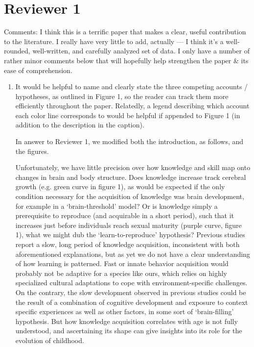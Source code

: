 \documentclass{article}
\newcommand{\rev}[1]{{\color{Red}#1}}
\newcommand{\comment}[1]{{\color{Blue}#1}}
\begin{document}
\section{Reviewer 1}
Comments:
I think this is a terrific paper that makes a clear, useful contribution to the literature. I really have very little to add, actually — I think it’s a well-rounded, well-written, and carefully analyzed set of data. I only have a number of rather minor comments below that will hopefully help strengthen the paper \& its ease of comprehension.
\begin{enumerate}
    \item It would be helpful to name and clearly state the three competing accounts / hypotheses, as outlined in Figure 1, so the reader can track them more efficiently throughout the paper. Relatedly, a legend describing which account each color line corresponds to would be helpful if appended to Figure 1 (in addition to the description in the caption).
    
    \comment{In answer to Reviewer 1, we modified both the introduction, as follows, and the figures.}
    
    \rev{Unfortunately, we have little precision over how knowledge and skill map onto changes in brain and body structure. Does knowledge increase track cerebral growth (e.g. green curve in figure 1), as would be expected if the only condition necessary for the acquisition of knowledge was brain development, for example in a `brain-threshold' model? Or is knowledge simply a prerequisite to reproduce (and acquirable in a short period), such that it increases just before individuals reach sexual maturity (purple curve, figure 1), what we might dub the `learn-to-reproduce' hypothesis? Previous studies report a slow, long period of knowledge acquisition, inconsistent with both aforementioned explanations, but as yet we do not have a clear understanding of how learning is patterned. Fast or innate behavior acquisition would probably not be adaptive for a species like ours, which relies on highly specialized cultural adaptations to cope with environment-specific challenges. On the contrary, the slow development observed in previous studies could be the result of a combination of cognitive development and exposure to context specific experiences as well as other factors, in some sort of `brain-filling' hypothesis. But how knowledge acquisition correlates with age is not fully understood, and ascertaining its shape can give insights into its role for the evolution of childhood. }


\end{enumerate}
\end{document}
